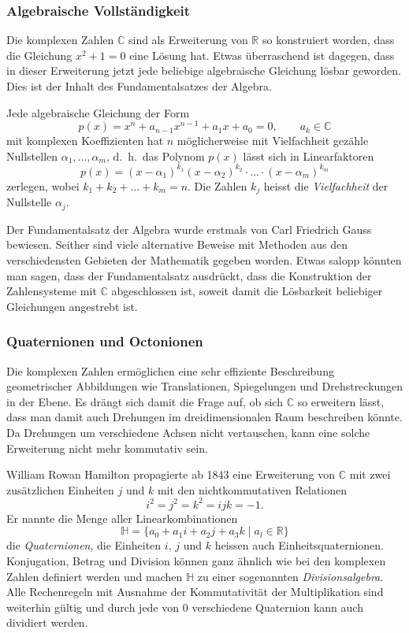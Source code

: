 \subsubsection{Algebraische Vollständigkeit}
Die komplexen Zahlen $\mathbb{C}$ sind als Erweiterung von $\mathbb{R}$
so konstruiert worden, dass die Gleichung $x^2+1=0$ eine Lösung hat.
Etwas überraschend ist dagegen, dass in dieser Erweiterung jetzt jede
beliebige algebraische Gleichung lösbar geworden.
Dies ist der Inhalt des Fundamentalsatzes der Algebra.

\begin{satz}
%
Jede algebraische Gleichung der Form
\[
p(x)=x^n + a_{n-1}x^{n-1}+a_1x+a_0=0,\qquad a_k\in\mathbb{C}
\]
mit komplexen Koeffizienten hat $n$ möglicherweise mit Vielfachheit
gezähle Nullstellen $\alpha_1,\dots,\alpha_m$, d.~h.~das Polynom $p(x)$
lässt sich in Linearfaktoren
\[
p(x)
=
(x-\alpha_1)^{k_1}(x-\alpha_2)^{k_2}\cdot\ldots\cdot(x-\alpha_m)^{k_m}
\]
zerlegen, wobei $k_1+k_2+\dots+k_m=n$.
Die Zahlen $k_j$ heisst die {\em Vielfachheit} der Nullstelle $\alpha_j$.
\end{satz}

Der Fundamentalsatz der Algebra wurde erstmals von Carl Friedrich Gauss
%
bewiesen.
Seither sind viele alternative Beweise mit Methoden aus den verschiedensten
Gebieten der Mathematik gegeben worden.
Etwas salopp könnten man sagen, dass der Fundamentalsatz ausdrückt, dass
die Konstruktion der Zahlensysteme mit $\mathbb{C}$ abgeschlossen ist,
soweit damit die Lösbarkeit beliebiger Gleichungen angestrebt ist.

\subsubsection{Quaternionen und Octonionen}
Die komplexen Zahlen ermöglichen eine sehr effiziente Beschreibung 
geometrischer Abbildungen wie Translationen, Spiegelungen und 
Drehstreckungen in der Ebene.
Es drängt sich damit die Frage auf, ob sich $\mathbb{C}$ so erweitern
lässt, dass man damit auch Drehungen im dreidimensionalen Raum
beschreiben könnte.
Da Drehungen um verschiedene Achsen nicht vertauschen, kann eine solche
Erweiterung nicht mehr kommutativ sein.

William Rowan Hamilton propagierte ab 1843 eine Erweiterung von $\mathbb{C}$
mit zwei zusätzlichen Einheiten $j$ und $k$ mit den nichtkommutativen
Relationen
\begin{equation}
i^2 = j^2 = k^2 = ijk = -1.
\label{buch:zahlen:eqn:quaternionenregeln}
\end{equation}
Er nannte die Menge aller Linearkombinationen 
\[
\mathbb{H} = \{ a_0+a_1i+a_2j+a_3k\;|\; a_l\in \mathbb{R}\}
\]
die {\em Quaternionen}, die Einheiten $i$, $j$ und $k$ heissen auch
%
Einheitsquaternionen.
%
Konjugation, Betrag und Division können ganz ähnlich wie bei den
komplexen Zahlen definiert werden und machen $\mathbb{H}$ zu einer
sogenannten {\em Divisionsalgebra}.
%
Alle Rechenregeln mit Ausnahme der Kommutativität der Multiplikation
sind weiterhin gültig und durch jede von $0$ verschiedene Quaternion
kann auch dividiert werden.

